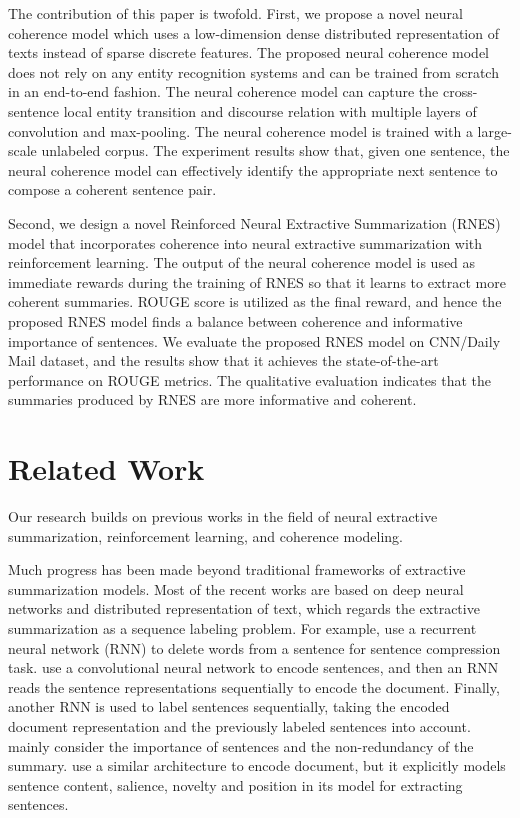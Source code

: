 \documentclass[letterpaper]{article} %
\begin{document}
	The contribution of this paper is twofold. First, we propose a novel neural coherence model which uses a low-dimension dense distributed representation of texts instead of sparse discrete features. The proposed neural coherence model does not rely on any entity recognition systems and can be trained from scratch in an end-to-end fashion. The neural coherence model can capture the cross-sentence local entity transition and discourse relation with multiple layers of convolution and max-pooling. The neural coherence model is trained with a large-scale unlabeled corpus. The experiment results show that, given one sentence, the neural coherence model can effectively identify the appropriate next sentence to compose a coherent sentence pair.
	
	Second, we design a novel Reinforced Neural Extractive Summarization (RNES) model that incorporates coherence into neural extractive summarization with reinforcement learning. The output of the neural coherence model is used as immediate rewards during the training of RNES so that it learns to extract more coherent summaries. ROUGE score is utilized as the final reward, and hence the proposed RNES model finds a balance between coherence and informative importance of sentences. We evaluate the proposed RNES model on CNN/Daily Mail dataset, and the results show that it achieves the state-of-the-art performance on ROUGE metrics. The qualitative evaluation indicates that the summaries produced by RNES are more informative and coherent.
	
	
	\section{Related Work}
	Our research builds on previous works in the field of neural extractive summarization, reinforcement learning, and coherence modeling.
	
	Much progress has been made beyond traditional frameworks of extractive summarization models. Most of the recent works are based on deep neural networks and distributed representation of text, which regards the extractive summarization as a sequence labeling problem. For example, \cite{filippova_sentence_2015} use a recurrent neural network (RNN) to delete words from a sentence for sentence compression task. \cite{jianpeng2016} use a convolutional neural network to encode sentences, and then an RNN reads the sentence representations sequentially to encode the document. Finally, another RNN is used to label sentences sequentially, taking the encoded document representation and the previously labeled sentences into account. \cite{jianpeng2016} mainly consider the importance of sentences and the non-redundancy of the summary. \cite{SummaRuNNer} use a similar architecture to encode document, but it explicitly models sentence content, salience, novelty and position in its model for extracting sentences.
	
\end{document}
